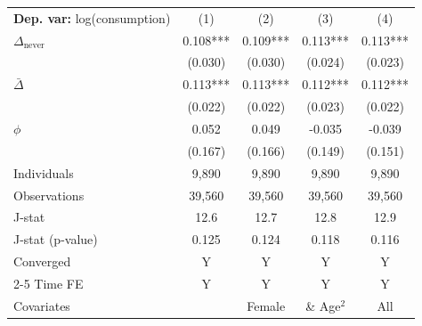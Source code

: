 \begin{tabular}{l cccc} \toprule  \textbf{Dep. var:}  log(consumption) 
                    &\multicolumn{1}{c}{(1)}   &\multicolumn{1}{c}{(2)}   &\multicolumn{1}{c}{(3)}   &\multicolumn{1}{c}{(4)}   \\

\addlinespace
$\Delta_{\text{never}}$&       0.108***&       0.109***&       0.113***&       0.113***\\
                    &     (0.030)   &     (0.030)   &     (0.024)   &     (0.023)   \\

\addlinespace
$\bar{\Delta}$      &       0.113***&       0.113***&       0.112***&       0.112***\\
                    &     (0.022)   &     (0.022)   &     (0.023)   &     (0.022)   \\

\addlinespace
$\phi$              &       0.052   &       0.049   &      -0.035   &      -0.039   \\
                    &     (0.167)   &     (0.166)   &     (0.149)   &     (0.151)   \\
\addlinespace
Individuals         &       9,890   &       9,890   &       9,890   &       9,890   \\
Observations        &      39,560   &      39,560   &      39,560   &      39,560   \\
J-stat              &        12.6   &        12.7   &        12.8   &        12.9   \\
J-stat (p-value)    &       0.125   &       0.124   &       0.118   &       0.116   \\
Converged           &           Y   &           Y   &           Y   &           Y   \\
\cmidrule{2-5} Time FE & Y & Y & Y & Y \\ Covariates & & Female & \& Age$^2$ & All \\ \bottomrule \end{tabular}
